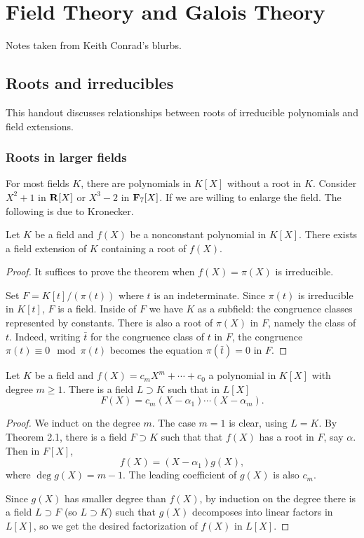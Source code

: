 \section{Field Theory and Galois Theory}
Notes taken from Keith Conrad's blurbs.

\subsection{Roots and irreducibles}
This handout discusses relationships between roots of irreducible
polynomials and field extensions.
\subsubsection{Roots in larger fields}
For most fields $K$, there are polynomials in $K[X]$ without a root in
$K$. Consider $X^2+1$ in $\mathbf{R}[X]$ or $X^3-2$ in $\mathbf{F}_7[X]$. If we are
willing to enlarge the field. The following is due to Kronecker.
\begin{theorem}
  Let $K$ be a field and $f(X)$ be a nonconstant polynomial in
  $K[X]$. There exists a field extension of $K$ containing a root of
  $f(X)$.
\end{theorem}
\begin{proof}
  It suffices to prove the theorem when $f(X)=\pi(X)$ is irreducible.

  Set $F=K[t]/(\pi(t))$ where $t$ is an indeterminate. Since $\pi(t)$ is
  irreducible in $K[t]$, $F$ is a field. Inside of $F$ we have $K$ as a
  subfield: the congruence classes represented by constants. There is also
  a root of $\pi(X)$ in $F$, namely the class of $t$. Indeed, writing $\bar
  t$ for the congruence class of $t$ in $F$, the congruence $\pi(t)\equiv
  0\mod \pi(t)$ becomes the equation $\pi(\bar t)=0$ in $F$.
\end{proof}

\begin{corollary}
  Let $K$ be a field and $f(X)=c_mX^m+\cdots+c_0$ a polynomial in $K[X]$
  with degree $m\geq 1$. There is a field $L\supset K$ such that in $L[X]$
  \[
    F(X)=c_m(X-\alpha_1)\cdots(X-\alpha_m).
  \]
\end{corollary}
\begin{proof}
  We induct on the degree $m$. The case $m=1$ is clear, using $L=K$. By
  Theorem 2.1, there is a field $F\supset K$ such that that $f(X)$ has a
  root in $F$, say $\alpha$. Then in $F[X]$,
  \[
    f(X)=(X-\alpha_1)g(X),
  \]
  where $\deg g(X)=m-1$. The leading coefficient of $g(X)$ is also $c_m$.

  Since $g(X)$ has smaller degree than $f(X)$, by induction on the degree
  there is a field $L\supset F$ (so $L\supset K$) such that $g(X)$
  decomposes into linear factors in $L[X]$, so we get the desired
  factorization of $f(X)$ in $L[X]$.
\end{proof}

